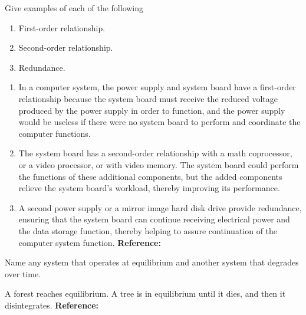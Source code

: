 \begin{exercises}
    \begin{exercise} 
    \label{sea-01-13}
        Give examples of each of the following
        \begin{enumerate}[label=\alph*)]
            \item First-order relationship.
            \item Second-order relationship.
            \item Redundance.
        \end{enumerate}
    \end{exercise}
    \begin{solution}
        \begin{enumerate}[label=\alph*)]
            \item In a computer system, the power supply and system board have a first-order relationship because the system board must receive the reduced voltage produced by the power supply in order to function, and the power supply would be useless if there were no system board to perform and coordinate the computer functions. 
            \item The system board has a second-order relationship with a math coprocessor, or a video processor, or with video memory. The system board could perform the functions of these additional components, but the added components relieve the system board’s workload, thereby improving its performance.
            \item  A second power supply or a mirror image hard disk drive provide redundance, ensuring that the system board can continue receiving electrical power and the data storage function, thereby helping to assure continuation of the computer system function. \textbf{Reference:}
        \end{enumerate}
    \end{solution}
    
    \begin{exercise} 
    \label{sea-01-16}
        Name any system that operates at equilibrium and another system that degrades over time.
    \end{exercise}
    \begin{solution}
        A forest reaches equilibrium. A tree is in equilibrium until it dies, and then it disintegrates. \textbf{Reference:}
    \end{solution}
    

\end{exercises}
